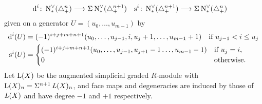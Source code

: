 \begin{align*}
	\operatorname{d}^i \colon  \operatorname{N}^\vee_{*}(\triangle_{+}^n) &\longrightarrow \Sigma^{}\operatorname{N}^\vee_{*}(\triangle_{+}^{n+1})
	&
	\operatorname{s}^i \colon  \operatorname{N}^\vee_{*}(\triangle_{+}^{n+1}) &\longrightarrow \Sigma^{}\operatorname{N}^\vee_{*}(\triangle_{+}^n)
\end{align*}
given on a generator $U=(u_0,\ldots,u_{m-1})$ by
\begin{align*}
	\operatorname{d}^i(U) &=
	(-1)^{i+j+m+n+1}(u_0,\ldots,u_{j-1},i,u_{j}+1,\ldots,u_{m-1}+1)
	\quad \text{if $u_{j-1}<i \leq u_{j}$}
	\\
	\operatorname{s}^i(U) &= \begin{cases}
	(-1)^{i+j+m+n+1}(u_0,\ldots,u_{j-1},u_{j+1}-1\ldots,u_{m-1}-1) 	& \text{if $u_{j} = i$,}
	\\
	0 & \text{otherwise.}
	\end{cases}
\end{align*}
 Let $\operatorname{L}(X)$ be the augmented simplicial graded $R$-module with $\operatorname{L}(X)_n = \Sigma^{n+1}\operatorname{{\it L}}(X)_{n}$, and face maps and degeneracies are induced by those of $\operatorname{{\it L}}(X)$ and have degree $-1$ and $+1$ respectively.

